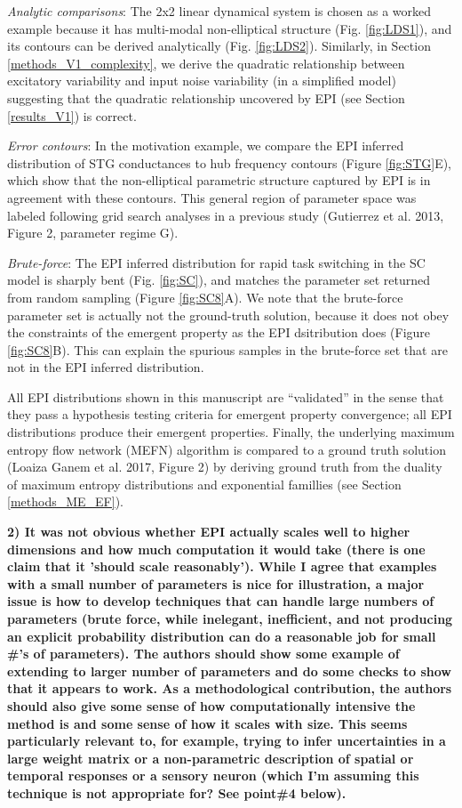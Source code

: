 \documentclass[11pt,a4paper]{article}
\begin{document}
\textit{Analytic comparisons}:
The 2x2 linear dynamical system is chosen as a worked example because it has multi-modal non-elliptical structure (Fig. \ref{fig:LDS1}), and its contours can be derived analytically (Fig. \ref{fig:LDS2}).
Similarly, in Section \ref{methods_V1_complexity}, we derive the quadratic relationship between excitatory variability and input noise variability (in a simplified model) suggesting that the quadratic relationship uncovered by EPI (see Section \ref{results_V1}) is correct.

\textit{Error contours}:
In the motivation example, we compare the EPI inferred distribution of STG conductances to hub frequency contours (Figure \ref{fig:STG}E), which show that the non-elliptical parametric structure captured by EPI is in agreement with these contours.  
This general region of parameter space was labeled following grid search analyses in a previous study (Gutierrez et al. 2013, Figure 2, parameter regime G).

\textit{Brute-force}:
The EPI inferred distribution for rapid task switching in the SC model is sharply bent (Fig. \ref{fig:SC}), and matches the parameter set returned from random sampling (Figure \ref{fig:SC8}A).  
We note that the brute-force parameter set is actually not the ground-truth solution, because it does not obey the constraints of the emergent property as the EPI dsitribution does (Figure \ref{fig:SC8}B).
This can explain the spurious samples in the brute-force set that are not in the EPI inferred distribution.

All EPI distributions shown in this manuscript are “validated” in the sense that they pass a hypothesis testing criteria for emergent property convergence; all EPI distributions produce their emergent properties.
Finally, the underlying maximum entropy flow network (MEFN) algorithm is compared to a ground truth solution (Loaiza Ganem et al. 2017, Figure 2) by deriving ground truth from the duality of maximum entropy distributions and exponential famillies (see Section \ref{methods_ME_EF}).

\textbf{2) It was not obvious whether EPI actually scales well to higher dimensions and how much computation it would take (there is one claim that it 'should scale reasonably'). While I agree that examples with a small number of parameters is nice for illustration, a major issue is how to develop techniques that can handle large numbers of parameters (brute force, while inelegant, inefficient, and not producing an explicit probability distribution can do a reasonable job for small \#'s of parameters). The authors should show some example of extending to larger number of parameters and do some checks to show that it appears to work. As a methodological contribution, the authors should also give some sense of how computationally intensive the method is and some sense of how it scales with size. This seems particularly relevant to, for example, trying to infer uncertainties in a large weight matrix or a non-parametric description of spatial or temporal responses or a sensory neuron (which I'm assuming this technique is not appropriate for? See point\#4 below). }
\end{document}
